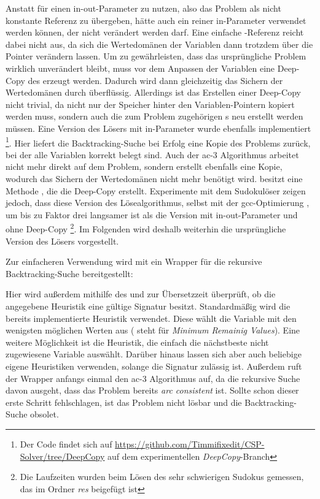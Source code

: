 Anstatt für  einen in-out-Parameter zu nutzen, also das Problem als nicht konstante Referenz zu übergeben, hätte auch ein reiner in-Parameter verwendet
werden können, der nicht verändert werden darf. Eine einfache -Referenz reicht dabei nicht aus, da sich die Wertedomänen der Variablen dann trotzdem über die
Pointer verändern lassen. Um zu gewährleisten, dass das ursprüngliche Problem wirklich unverändert bleibt, muss vor dem Anpassen der Variablen eine Deep-Copy des 
erzeugt werden. Dadurch wird dann gleichzeitig das Sichern der Wertedomänen durch  überflüssig. Allerdings ist das Erstellen einer Deep-Copy nicht
trivial, da nicht nur der Speicher hinter den Variablen-Pointern kopiert werden muss, sondern auch die zum Problem zugehörigen s neu erstellt werden müssen. Eine
Version des Lösers mit in-Parameter wurde ebenfalls implementiert \footnote{Der Code findet sich auf \url{https://github.com/Timmifixedit/CSP-Solver/tree/DeepCopy} auf dem
experimentellen \textit{DeepCopy}-Branch}. Hier liefert die Backtracking-Suche bei Erfolg eine Kopie des Problems zurück, bei der alle Variablen korrekt belegt sind. Auch der
\ac*{ac}-3 Algorithmus arbeitet nicht mehr direkt auf dem Problem, sondern erstellt ebenfalls eine Kopie, wodurch das Sichern der Wertedomänen nicht mehr benötigt wird.
 besitzt eine Methode , die die Deep-Copy erstellt. Experimente mit dem Sudokulöser zeigen jedoch, dass diese Version des Lösealgorithmus, selbst
mit der gcc-Optimierung , um bis zu Faktor drei langsamer ist als die Version mit in-out-Parameter und ohne Deep-Copy \footnote{Die Laufzeiten wurden beim Lösen des
sehr schwierigen Sudokus gemessen, das im Ordner \textit{res} beigefügt ist}. Im Folgenden wird deshalb weiterhin die ursprüngliche Version des Lösers vorgestellt.

Zur einfacheren Verwendung wird mit  ein Wrapper für die rekursive Backtracking-Suche bereitgestellt:

Hier wird außerdem mithilfe des  und  zur Übersetzzeit überprüft, ob die angegebene Heuristik eine gültige Signatur besitzt.
Standardmäßig wird die bereits implementierte Heuristik  verwendet. Diese wählt die Variable mit den wenigsten möglichen Werten aus ( steht
für \textit{Minimum Remainig Values}). Eine weitere Möglichkeit ist die  Heuristik, die einfach die nächstbeste nicht zugewiesene Variable auswählt.
Darüber hinaus lassen sich aber auch beliebige eigene Heuristiken verwenden, solange die Signatur zulässig ist. Außerdem ruft der Wrapper anfangs einmal den \ac*{ac}-3 Algorithmus
auf, da die rekursive Suche davon ausgeht, dass das Problem bereits \textit{arc consistent} ist. Sollte schon dieser erste Schritt fehlschlagen, ist das Problem nicht lösbar und die
Backtracking-Suche obsolet.